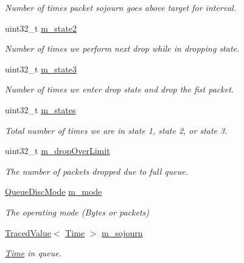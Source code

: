 \begin{DoxyCompactItemize}
\begin{DoxyCompactList}\small\item\em Number of times packet sojourn goes above target for interval. \end{DoxyCompactList}\item 
uint32\+\_\+t \hyperlink{classns3_1_1CoDelQueueDisc_afbccfc67434a2b3767ef21fb33beeb86}{m\+\_\+state2}
\begin{DoxyCompactList}\small\item\em Number of times we perform next drop while in dropping state. \end{DoxyCompactList}\item 
uint32\+\_\+t \hyperlink{classns3_1_1CoDelQueueDisc_a2d42fc65424271f253f395283ed0ee2d}{m\+\_\+state3}
\begin{DoxyCompactList}\small\item\em Number of times we enter drop state and drop the fist packet. \end{DoxyCompactList}\item 
uint32\+\_\+t \hyperlink{classns3_1_1CoDelQueueDisc_a9354ec02c9da7af518fba50f067d0648}{m\+\_\+states}
\begin{DoxyCompactList}\small\item\em Total number of times we are in state 1, state 2, or state 3. \end{DoxyCompactList}\item 
uint32\+\_\+t \hyperlink{classns3_1_1CoDelQueueDisc_a742127eaa6469536b37a40e2c31292b4}{m\+\_\+drop\+Over\+Limit}
\begin{DoxyCompactList}\small\item\em The number of packets dropped due to full queue. \end{DoxyCompactList}\item 
\hyperlink{classns3_1_1CoDelQueueDisc_a6149d83cd9f193b54b55efa7309b79eb}{Queue\+Disc\+Mode} \hyperlink{classns3_1_1CoDelQueueDisc_ab7948d66bebfcc5c1ac4e0d47636a068}{m\+\_\+mode}
\begin{DoxyCompactList}\small\item\em The operating mode (Bytes or packets) \end{DoxyCompactList}\item 
\hyperlink{classns3_1_1TracedValue}{Traced\+Value}$<$ \hyperlink{classns3_1_1Time}{Time} $>$ \hyperlink{classns3_1_1CoDelQueueDisc_a13049e1c243e1467bd1637cf203c60cb}{m\+\_\+sojourn}
\begin{DoxyCompactList}\small\item\em \hyperlink{classns3_1_1Time}{Time} in queue. \end{DoxyCompactList}\end{DoxyCompactItemize}
